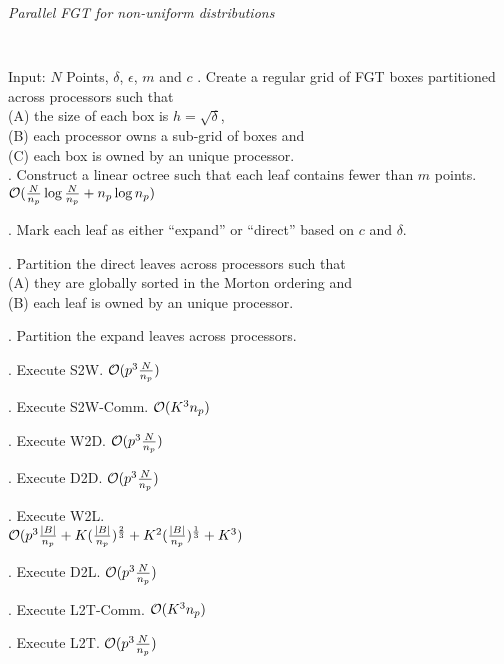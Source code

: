 \begin{algorithm}[!h]
\caption{ \label{a:ofgt}
\em Parallel FGT for non-uniform distributions}
{\tt
\begin{algorithmic}
\STATE Input: $N$ Points, $\delta$, $\epsilon$, $m$ and $c$
. Create a regular grid of FGT boxes partitioned across processors such that \\
 (A) the size of each box is $h = \sqrt{\delta}$, \\
 (B) each processor owns a sub-grid of boxes and \\
 (C) each box is owned by an unique processor. \\

. Construct a linear octree such that each leaf contains fewer than $m$ points. \\
\hfill $\mathcal{O}(\frac{N}{n_p} \log{\frac{N}{n_p}} + n_p \log{n_p})$

. Mark each leaf as either ``expand'' or ``direct'' based on $c$ and $\delta$.

. Partition the direct leaves across processors such that \\
  (A) they are globally sorted in the Morton ordering and \\
  (B) each leaf is owned by an unique processor.

. Partition the expand leaves across processors. 

. Execute S2W. \hfill $\mathcal{O}(p^3 \frac{N}{n_p})$

. Execute S2W-Comm. \hfill $\mathcal{O}(K^3 n_p)$

. Execute W2D. \hfill $\mathcal{O}(p^3 \frac{N}{n_p})$

. Execute D2D. \hfill $\mathcal{O}(p^3 \frac{N}{n_p})$

. Execute W2L. \\
 \hfill $\mathcal{O}(p^3 \frac{|B|}{n_p} + K (\frac{|B|}{n_p})^{\frac{2}{3}} + K^2(\frac{|B|}{n_p})^{\frac{1}{3}} + K^3 )$ 

. Execute D2L. \hfill $\mathcal{O}(p^3 \frac{N}{n_p})$

. Execute L2T-Comm. \hfill $\mathcal{O}(K^3 n_p)$

. Execute L2T. \hfill $\mathcal{O}( p^3\frac{N}{n_p})$
\end{algorithmic}
}
\end{algorithm}


